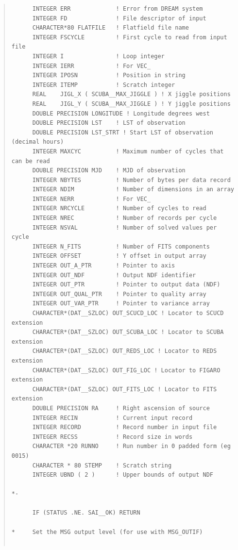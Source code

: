\documentclass[twoside,11pt]{article}
\newenvironment{myquote}{\begin{quote}\begin{small}}{\end{small}\end{quote}}
\renewcommand{\_}{\texttt{\symbol{95}}}
\begin{document}
\begin{myquote}
\begin{verbatim}
      INTEGER ERR             ! Error from DREAM system
      INTEGER FD              ! File descriptor of input
      CHARACTER*80 FLATFILE   ! Flatfield file name
      INTEGER FSCYCLE         ! First cycle to read from input file
      INTEGER I               ! Loop integer
      INTEGER IERR            ! For VEC_
      INTEGER IPOSN           ! Position in string
      INTEGER ITEMP           ! Scratch integer
      REAL    JIGL_X ( SCUBA__MAX_JIGGLE ) ! X jiggle positions
      REAL    JIGL_Y ( SCUBA__MAX_JIGGLE ) ! Y jiggle positions
      DOUBLE PRECISION LONGITUDE ! Longitude degrees west
      DOUBLE PRECISION LST    ! LST of observation
      DOUBLE PRECISION LST_STRT ! Start LST of observation (decimal hours)
      INTEGER MAXCYC          ! Maximum number of cycles that can be read
      DOUBLE PRECISION MJD    ! MJD of observation
      INTEGER NBYTES          ! Number of bytes per data record
      INTEGER NDIM            ! Number of dimensions in an array
      INTEGER NERR            ! For VEC_
      INTEGER NRCYCLE         ! Number of cycles to read
      INTEGER NREC            ! Number of records per cycle
      INTEGER NSVAL           ! Number of solved values per cycle
      INTEGER N_FITS          ! Number of FITS components
      INTEGER OFFSET          ! Y offset in output array
      INTEGER OUT_A_PTR       ! Pointer to axis
      INTEGER OUT_NDF         ! Output NDF identifier
      INTEGER OUT_PTR         ! Pointer to output data (NDF)
      INTEGER OUT_QUAL_PTR    ! Pointer to quality array
      INTEGER OUT_VAR_PTR     ! Pointer to variance array
      CHARACTER*(DAT__SZLOC) OUT_SCUCD_LOC ! Locator to SCUCD extension
      CHARACTER*(DAT__SZLOC) OUT_SCUBA_LOC ! Locator to SCUBA extension
      CHARACTER*(DAT__SZLOC) OUT_REDS_LOC ! Locator to REDS extension
      CHARACTER*(DAT__SZLOC) OUT_FIG_LOC ! Locator to FIGARO extension
      CHARACTER*(DAT__SZLOC) OUT_FITS_LOC ! Locator to FITS extension
      DOUBLE PRECISION RA     ! Right ascension of source
      INTEGER RECIN           ! Current input record
      INTEGER RECORD          ! Record number in input file
      INTEGER RECSS           ! Record size in words
      CHARACTER *20 RUNNO     ! Run number in 0 padded form (eg 0015) 
      CHARACTER * 80 STEMP    ! Scratch string
      INTEGER UBND ( 2 )      ! Upper bounds of output NDF

*-

      IF (STATUS .NE. SAI__OK) RETURN

*     Set the MSG output level (for use with MSG_OUTIF)
 

\end{verbatim}
\end{myquote}
\end{document}
